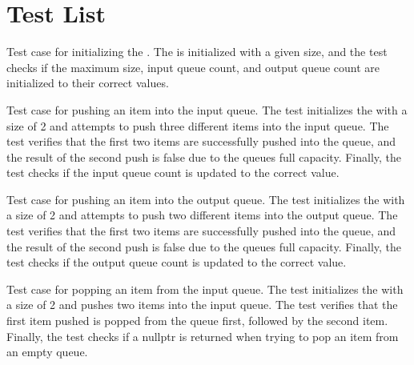\chapter{Test List}
\hypertarget{test}{}\label{test}

\begin{DoxyRefList}
\item[Member \doxylink{memory__manager_8test_8cc_a869f8d44bd06d29b1285fbc3611b966f}{TEST} (Memory\+Manager\+Test, Initial)]\label{test__test000001}%
%
Test case for initializing the . The  is initialized with a given size, and the test checks if the maximum size, input queue count, and output queue count are initialized to their correct values.  
\item[Member \doxylink{memory__manager_8test_8cc_a25d0c0534f912bb6607daf8677285310}{TEST} (Memory\+Manager\+Test, Push\+Into\+In)]\label{test__test000002}%
%
Test case for pushing an item into the input queue. The test initializes the  with a size of 2 and attempts to push three different items into the input queue. The test verifies that the first two items are successfully pushed into the queue, and the result of the second push is false due to the queue\textquotesingle{}s full capacity. Finally, the test checks if the input queue count is updated to the correct value.  
\item[Member \doxylink{memory__manager_8test_8cc_aa4d93c94a4ad6503f1eb36bdea15cbd8}{TEST} (Memory\+Manager\+Test, Push\+Into\+Out)]\label{test__test000003}%
%
Test case for pushing an item into the output queue. The test initializes the  with a size of 2 and attempts to push two different items into the output queue. The test verifies that the first two items are successfully pushed into the queue, and the result of the second push is false due to the queue\textquotesingle{}s full capacity. Finally, the test checks if the output queue count is updated to the correct value.  
\item[Member \doxylink{memory__manager_8test_8cc_a0c4ba9c85a884661b43550d7973bf254}{TEST} (Memory\+Manager\+Test, Pop\+From\+In)]\label{test__test000004}%
%
Test case for popping an item from the input queue. The test initializes the  with a size of 2 and pushes two items into the input queue. The test verifies that the first item pushed is popped from the queue first, followed by the second item. Finally, the test checks if a nullptr is returned when trying to pop an item from an empty queue.  

\end{DoxyRefList}

